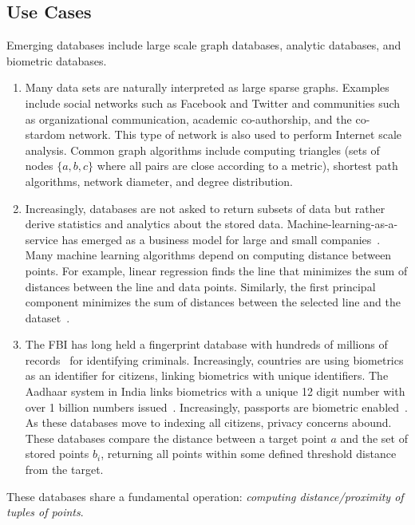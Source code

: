 \subsection{Use Cases}
Emerging databases include large scale graph databases, analytic databases, and
biometric databases. 
\begin{enumerate}
\item Many data sets are naturally interpreted as large sparse graphs.  Examples include social networks such as Facebook and Twitter and communities such as organizational communication, academic co-authorship, and the co-stardom network.  This type of network is also used to perform Internet scale analysis.  Common graph algorithms include computing triangles (sets of nodes $\{a,b,c\}$ where all pairs are close according to a metric), shortest path algorithms, network diameter, and degree distribution.
\item  Increasingly, databases are not asked to return subsets of data
but rather derive statistics and analytics about the stored data.
Machine-learning-as-a-service has emerged as a business model for large
and small companies~\cite{mlservice}.  Many machine learning algorithms
depend on computing distance between points. For example, linear regression finds the
line that minimizes the sum of distances between the line and data
points.  Similarly, the first principal component minimizes the sum of
distances between the selected line and the
dataset~\cite{wold1987principal}.
\item The FBI has long held a fingerprint database with hundreds of millions of records~\cite{brislawn1996fbi} for identifying criminals.  Increasingly, countries are using biometrics as an identifier for citizens, linking biometrics with unique identifiers.  The Aadhaar system in India links biometrics with a unique 12 digit number with over 1 billion numbers issued~\cite{daugman2014600}.  Increasingly, passports are biometric enabled~\cite{stanton2008icao}.  As these databases move to indexing all citizens, privacy concerns abound.
These databases compare the distance between a target point $a$ and the
set of stored points $b_i$, returning all points within some defined
threshold distance from the target.
\end{enumerate}

\noindent
These databases share a fundamental operation: {\em
computing distance/proximity of tuples of points}. 

